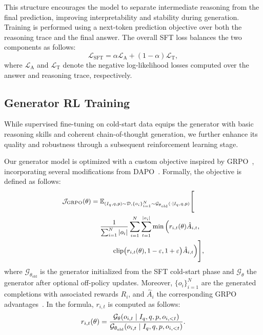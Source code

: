 This structure encourages the model to separate intermediate reasoning from the final prediction, improving interpretability and stability during generation.
Training is performed using a next-token prediction objective over both the reasoning trace and the final answer. The overall SFT loss balances the two components as follows:
\begin{equation}
    \mathcal{L}_\mathrm{SFT} = \alpha\mathcal{L}_{\mathrm{A}} + (1-\alpha)\mathcal{L}_{\mathrm{T}},
\end{equation}
where $\mathcal{L}_{\mathrm{A}}$ and $\mathcal{L}_{\mathrm{T}}$ denote the negative log-likelihood losses computed over the answer and reasoning trace, respectively.

\subsection{Generator RL Training} 
\label{sec:generator_training}
While supervised fine-tuning on cold-start data equips the generator with basic reasoning skills and coherent chain-of-thought generation, we further enhance its quality and robustness through a subsequent reinforcement learning stage.

Our generator model is optimized with a custom objective inspired by GRPO~\cite{shao2024deepseekmath}, incorporating several modifications from DAPO~\cite{yu2025dapo}. Formally, the objective is defined as follows:
\begin{equation}
\small
\begin{aligned}
\mathcal{J}_{\text{GRPO}}(\theta) =\;& 
\mathbb{E}_{(I_q, q, p)\sim \mathcal{D}, \{o_i\}_{i=1}^N \sim \mathcal{G}_{\theta_\text{old}}(\cdot \mid I_q, q, p)} \Bigg[ \\
& \frac{1}{\sum_{i=1}^{N} |o_i|} 
  \sum_{i=1}^{N} \sum_{t=1}^{|o_i|} 
    \min \Big( 
        r_{i,t}(\theta) \hat{A}_{i,t}, \\
& \qquad \text{clip}\big( r_{i,t}(\theta), 1 - \varepsilon, 1 + \varepsilon \big) \hat{A}_{i,t} 
      \Big) 
\Bigg],
\end{aligned}
\label{eq:customgrpoloss}
\end{equation}
where $\mathcal{G}_{\theta_\text{old}}$ is the generator initialized from the SFT cold-start phase and $\mathcal{G}_\theta$ the generator after optional off-policy updates. Moreover, $\{o_i\}_{i=1}^N$ are the generated completions with  associated rewards $R_i$, and $\hat{A}_i$ the corresponding GRPO advantages~\cite{shao2024deepseekmath}.
In the formula, $r_{i,t}$ is computed as follows:
\begin{equation}
\small
    r_{i,t}(\theta)=\frac{\mathcal{G}_{\theta}(o_{i,t} \mid I_q, q, p ,o_{i,<t})}{\mathcal{G}_{\theta_{\text{old}}}(o_{i,t} \mid  I_q, q, p ,o_{i,<t})}.
\label{eq:off_policy_ratio}
\end{equation}

